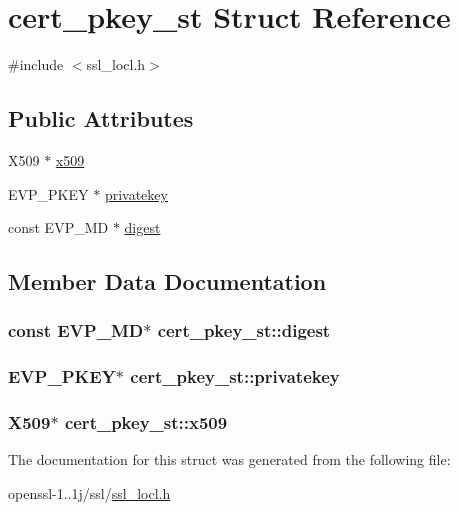 \hypertarget{structcert__pkey__st}{\section{cert\-\_\-pkey\-\_\-st Struct Reference}
\label{structcert__pkey__st}
}


{\ttfamily \#include $<$ssl\-\_\-locl.\-h$>$}

\subsection*{Public Attributes}
\begin{DoxyCompactItemize}
\item 
X509 $\ast$ \hyperlink{structcert__pkey__st_a0120b099e83113d177d4394b0e129b18}{x509}
\item 
E\-V\-P\-\_\-\-P\-K\-E\-Y $\ast$ \hyperlink{structcert__pkey__st_ad7823215cdf3d25ebcd7c9d748b4432c}{privatekey}
\item 
const E\-V\-P\-\_\-\-M\-D $\ast$ \hyperlink{structcert__pkey__st_aaf277f08fbcd41232dc61545edd476df}{digest}
\end{DoxyCompactItemize}


\subsection{Member Data Documentation}
\hypertarget{structcert__pkey__st_aaf277f08fbcd41232dc61545edd476df}{
\subsubsection[{digest}]{\setlength{\rightskip}{0pt plus 5cm}const E\-V\-P\-\_\-\-M\-D$\ast$ cert\-\_\-pkey\-\_\-st\-::digest}}\label{structcert__pkey__st_aaf277f08fbcd41232dc61545edd476df}
\hypertarget{structcert__pkey__st_ad7823215cdf3d25ebcd7c9d748b4432c}{
\subsubsection[{privatekey}]{\setlength{\rightskip}{0pt plus 5cm}E\-V\-P\-\_\-\-P\-K\-E\-Y$\ast$ cert\-\_\-pkey\-\_\-st\-::privatekey}}\label{structcert__pkey__st_ad7823215cdf3d25ebcd7c9d748b4432c}
\hypertarget{structcert__pkey__st_a0120b099e83113d177d4394b0e129b18}{
\subsubsection[{x509}]{\setlength{\rightskip}{0pt plus 5cm}X509$\ast$ cert\-\_\-pkey\-\_\-st\-::x509}}\label{structcert__pkey__st_a0120b099e83113d177d4394b0e129b18}


The documentation for this struct was generated from the following file\-:\begin{DoxyCompactItemize}
\item 
openssl-\/1..\-1j/ssl/\hyperlink{ssl__locl_8h}{ssl\-\_\-locl.\-h}\end{DoxyCompactItemize}

